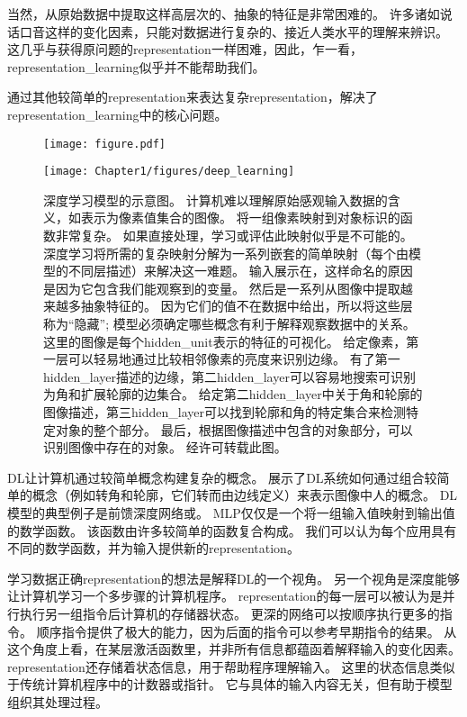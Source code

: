 当然，从原始数据中提取这样高层次的、抽象的特征是非常困难的。
许多诸如说话口音这样的变化因素，只能对数据进行复杂的、接近人类水平的理解来辨识。
这几乎与获得原问题的\gls{representation}一样困难，因此，乍一看，\gls{representation_learning}似乎并不能帮助我们。

通过其他较简单的\gls{representation}来表达复杂\gls{representation}，解决了\gls{representation_learning}中的核心问题。

\begin{figure}[!htb]
\ifOpenSource
\centerline{\texttt{[image: figure.pdf]}}
\else
\centerline{\texttt{[image: Chapter1/figures/deep\_learning]}}
\fi
\caption{深度学习模型的示意图。 计算机难以理解原始感观输入数据的含义，如表示为像素值集合的图像。
将一组像素映射到对象标识的函数非常复杂。
如果直接处理，学习或评估此映射似乎是不可能的。
深度学习将所需的复杂映射分解为一系列嵌套的简单映射（每个由模型的不同层描述）来解决这一难题。
输入展示在，这样命名的原因是因为它包含我们能观察到的变量。
然后是一系列从图像中提取越来越多抽象特征的。
因为它们的值不在数据中给出，所以将这些层称为``隐藏''; 模型必须确定哪些概念有利于解释观察数据中的关系。
这里的图像是每个\gls{hidden_unit}表示的特征的可视化。
给定像素，第一层可以轻易地通过比较相邻像素的亮度来识别边缘。
有了第一\gls{hidden_layer}描述的边缘，第二\gls{hidden_layer}可以容易地搜索可识别为角和扩展轮廓的边集合。
给定第二\gls{hidden_layer}中关于角和轮廓的图像描述，第三\gls{hidden_layer}可以找到轮廓和角的特定集合来检测特定对象的整个部分。
最后，根据图像描述中包含的对象部分，可以识别图像中存在的对象。
经\citet{ZeilerFergus14}许可转载此图。
}
\label{fig:chap1_deep_learning}
\end{figure}

\gls{DL}让计算机通过较简单概念构建复杂的概念。
展示了\gls{DL}系统如何通过组合较简单的概念（例如转角和轮廓，它们转而由边线定义）来表示图像中人的概念。
\gls{DL}模型的典型例子是前馈深度网络或。
\gls{MLP}仅仅是一个将一组输入值映射到输出值的数学函数。
该函数由许多较简单的函数复合构成。
我们可以认为每个应用具有不同的数学函数，并为输入提供新的\gls{representation}。

学习数据正确\gls{representation}的想法是解释\gls{DL}的一个视角。
另一个视角是深度能够让计算机学习一个多步骤的计算机程序。
\gls{representation}的每一层可以被认为是并行执行另一组指令后计算机的存储器状态。
更深的网络可以按顺序执行更多的指令。
顺序指令提供了极大的能力，因为后面的指令可以参考早期指令的结果。
从这个角度上看，在某层激活函数里，并非所有信息都蕴函着解释输入的变化因素。
\gls{representation}还存储着状态信息，用于帮助程序理解输入。
这里的状态信息类似于传统计算机程序中的计数器或指针。
它与具体的输入内容无关，但有助于模型组织其处理过程。

